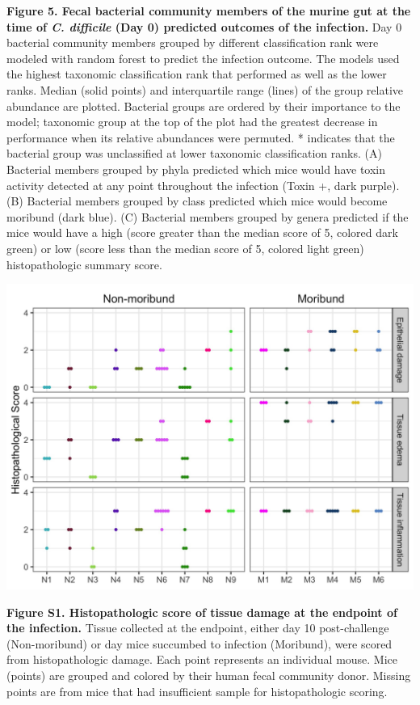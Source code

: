 \documentclass[
  12pt,
]{article}
\begin{document}
\textbf{Figure 5. Fecal bacterial community members of the murine gut at
the time of \emph{C. difficile} (Day 0) predicted outcomes of the
infection.} Day 0 bacterial community members grouped by different
classification rank were modeled with random forest to predict the
infection outcome. The models used the highest taxonomic classification
rank that performed as well as the lower ranks. Median (solid points)
and interquartile range (lines) of the group relative abundance are
plotted. Bacterial groups are ordered by their importance to the model;
taxonomic group at the top of the plot had the greatest decrease in
performance when its relative abundances were permuted. * indicates that
the bacterial group was unclassified at lower taxonomic classification
ranks. (A) Bacterial members grouped by phyla predicted which mice would
have toxin activity detected at any point throughout the infection
(Toxin +, dark purple). (B) Bacterial members grouped by class predicted
which mice would become moribund (dark blue). (C) Bacterial members
grouped by genera predicted if the mice would have a high (score greater
than the median score of 5, colored dark green) or low (score less than
the median score of 5, colored light green) histopathologic summary
score.

\hfill\break

\includegraphics{../results/figures/figure_S1.jpg}

\textbf{Figure S1. Histopathologic score of tissue damage at the
endpoint of the infection.} Tissue collected at the endpoint, either day
10 post-challenge (Non-moribund) or day mice succumbed to infection
(Moribund), were scored from histopathologic damage. Each point
represents an individual mouse. Mice (points) are grouped and colored by
their human fecal community donor. Missing points are from mice that had
insufficient sample for histopathologic scoring.
\end{document}
